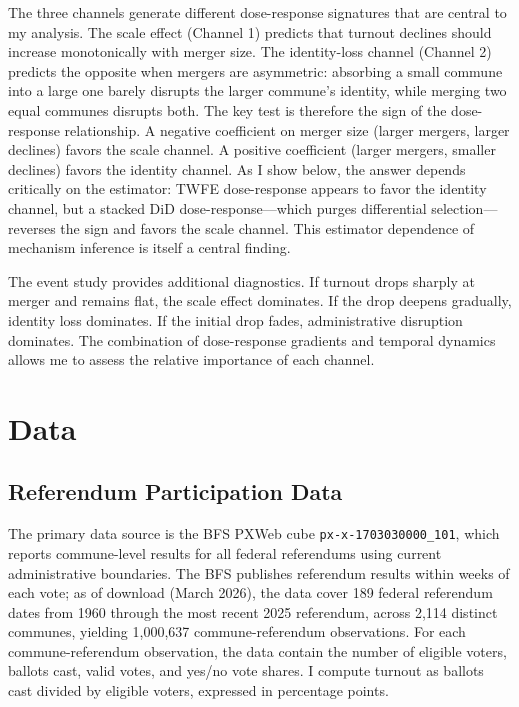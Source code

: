 \documentclass[12pt]{article}
\begin{document}
The three channels generate different dose-response signatures that are central to my analysis. The scale effect (Channel 1) predicts that turnout declines should increase monotonically with merger size. The identity-loss channel (Channel 2) predicts the opposite when mergers are asymmetric: absorbing a small commune into a large one barely disrupts the larger commune's identity, while merging two equal communes disrupts both. The key test is therefore the sign of the dose-response relationship. A negative coefficient on merger size (larger mergers, larger declines) favors the scale channel. A positive coefficient (larger mergers, smaller declines) favors the identity channel. As I show below, the answer depends critically on the estimator: TWFE dose-response appears to favor the identity channel, but a stacked DiD dose-response---which purges differential selection---reverses the sign and favors the scale channel. This estimator dependence of mechanism inference is itself a central finding.

The event study provides additional diagnostics. If turnout drops sharply at merger and remains flat, the scale effect dominates. If the drop deepens gradually, identity loss dominates. If the initial drop fades, administrative disruption dominates. The combination of dose-response gradients and temporal dynamics allows me to assess the relative importance of each channel.


\section{Data}

\subsection{Referendum Participation Data}

The primary data source is the BFS PXWeb cube \texttt{px-x-1703030000\_101}, which reports commune-level results for all federal referendums using current administrative boundaries. The BFS publishes referendum results within weeks of each vote; as of download (March 2026), the data cover 189 federal referendum dates from 1960 through the most recent 2025 referendum, across 2,114 distinct communes, yielding 1,000,637 commune-referendum observations. For each commune-referendum observation, the data contain the number of eligible voters, ballots cast, valid votes, and yes/no vote shares. I compute turnout as ballots cast divided by eligible voters, expressed in percentage points.
\end{document}
